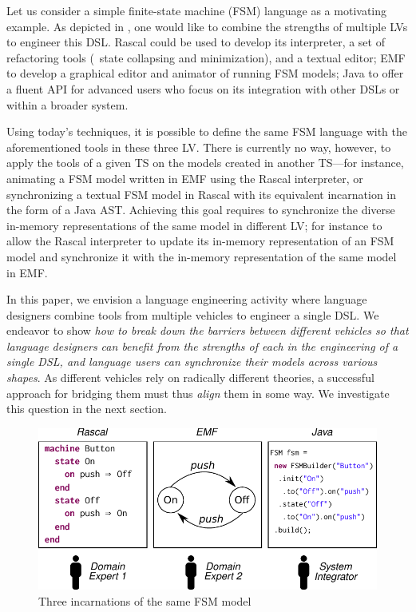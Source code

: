 Let us consider a simple finite-state machine (FSM) language as a motivating example.
As depicted in , one would like to combine the strengths of multiple LVs to engineer this DSL.
Rascal could be used to develop its interpreter, a set of refactoring tools (\eg~state collapsing and minimization), and a textual editor; EMF to develop a graphical editor and animator of running FSM models; Java to offer a fluent API for advanced users who focus on its integration with other DSLs or within a broader system.

Using today's techniques, it is possible to define the same FSM language with the aforementioned tools in these three LV.
There is currently no way, however, to apply the tools of a given TS on the models created in another TS---for instance, animating a FSM model written in EMF using the Rascal interpreter, or synchronizing a textual FSM model in Rascal with its equivalent incarnation in the form of a Java AST.
Achieving this goal requires to synchronize the diverse in-memory representations of the same model in different LV; for instance to allow the Rascal interpreter to update its in-memory representation of an FSM model and synchronize it with the in-memory representation of the same model in EMF.

In this paper, we envision a language engineering activity where language designers combine tools from multiple vehicles to engineer a single DSL.
We endeavor to show \emph{how to break down the barriers between different vehicles so that language designers can benefit from the strengths of each in the engineering of a single DSL, and language users can synchronize their models across various shapes}.
As different vehicles rely on radically different theories, a successful approach for bridging them must thus \emph{align}  them in some way.
We investigate this question in the next section.

\begin{figure}[bt]
	\centering
	\includegraphics[width=\columnwidth]{figures/motivating-fsm-simplified}
	\caption{Three incarnations of the same FSM model}
	\label{fig:motivating-fsm}
\end{figure}
